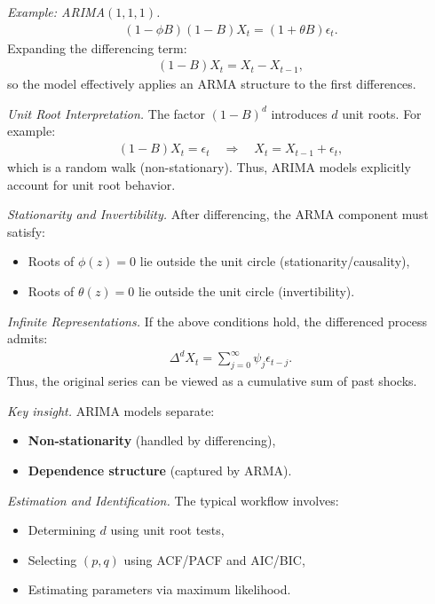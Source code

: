 \documentclass[10pt,a4paper]{article}
\begin{document}
	\textit{Example: ARIMA$(1,1,1)$.}
	\begin{align*}
	(1 - \phi B)(1 - B)X_t = (1 + \theta B)\epsilon_t.
	\end{align*}
	Expanding the differencing term:
	\begin{align*}
	(1 - B)X_t = X_t - X_{t-1},
	\end{align*}
	so the model effectively applies an ARMA structure to the first differences.
	
	\textit{Unit Root Interpretation.} The factor $(1 - B)^d$ introduces $d$ unit roots. For example:
	\begin{align*}
	(1 - B)X_t = \epsilon_t \quad \Rightarrow \quad X_t = X_{t-1} + \epsilon_t,
	\end{align*}
	which is a random walk (non-stationary). Thus, ARIMA models explicitly account for unit root behavior.
	
	\textit{Stationarity and Invertibility.} After differencing, the ARMA component must satisfy:
	\begin{itemize}
	\item Roots of $\phi(z)=0$ lie outside the unit circle (stationarity/causality),
	\item Roots of $\theta(z)=0$ lie outside the unit circle (invertibility).
	\end{itemize}
	
	\textit{Infinite Representations.} If the above conditions hold, the differenced process admits:
	\begin{align*}
	\Delta^d X_t = \sum_{j=0}^{\infty} \psi_j \epsilon_{t-j}.
	\end{align*}
	Thus, the original series can be viewed as a cumulative sum of past shocks.
	
	\textit{Key insight.} ARIMA models separate:
	\begin{itemize}
	\item \textbf{Non-stationarity} (handled by differencing),
	\item \textbf{Dependence structure} (captured by ARMA).
	\end{itemize}
	
	\textit{Estimation and Identification.} The typical workflow involves:
	\begin{itemize}
	\item Determining $d$ using unit root tests,
	\item Selecting $(p,q)$ using ACF/PACF and AIC/BIC,
	\item Estimating parameters via maximum likelihood.
	\end{itemize}
	
\end{document}
